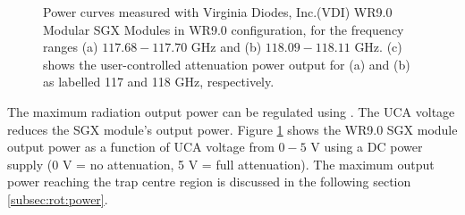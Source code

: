 \begin{figure}[!htb]
    \hfill
    \caption{Power curves measured with Virginia Diodes, Inc.(VDI) WR9.0 Modular SGX Modules in WR9.0 configuration, for the frequency ranges (a) $117.68-117.70$ GHz and (b) $118.09-118.11$ GHz. (c) shows the user-controlled attenuation power output for (a) and (b) as labelled 117 and 118 GHz, respectively. }
    \label{fig:power-attenuation}
\end{figure}

The maximum radiation output power can be regulated using . The UCA voltage reduces the SGX module's output power. Figure \ref{fig:power-attenuation} shows the WR9.0 SGX module output power as a function of UCA voltage from  $0-5$ V using a DC power supply (0 V = no attenuation, 5 V = full attenuation). The maximum output power reaching the trap centre region is discussed in the following section \ref{subsec:rot:power}.

\clearpage
